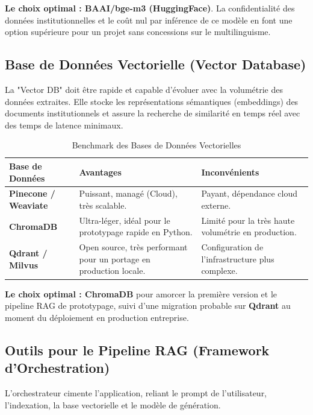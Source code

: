 \documentclass[12pt,a4paper]{article}
\begin{document}
\textbf{Le choix optimal : BAAI/bge-m3 (HuggingFace)}. La confidentialité des données institutionnelles et le coût nul par inférence de ce modèle en font une option supérieure pour un projet sans concessions sur le multilinguisme.

\subsection{Base de Données Vectorielle (Vector Database)}
La "Vector DB" doit être rapide et capable d'évoluer avec la volumétrie des données extraites. Elle stocke les représentations sémantiques (embeddings) des documents institutionnels et assure la recherche de similarité en temps réel avec des temps de latence minimaux.

\begin{table}[H]
    \centering
    \renewcommand{\arraystretch}{1.5}
    \begin{tabularx}{\textwidth}{|X|X|X|}
        \hline
        \textbf{Base de Données} & \textbf{Avantages} & \textbf{Inconvénients} \\
        \hline
        \textbf{Pinecone / Weaviate} & Puissant, managé (Cloud), très scalable. & Payant, dépendance cloud externe. \\
        \hline
        \textbf{ChromaDB} & Ultra-léger, idéal pour le prototypage rapide en Python. & Limité pour la très haute volumétrie en production. \\
        \hline
        \textbf{Qdrant / Milvus} & Open source, très performant pour un portage en production locale. & Configuration de l'infrastructure plus complexe. \\
        \hline
    \end{tabularx}
    \caption{Benchmark des Bases de Données Vectorielles}
\end{table}

\textbf{Le choix optimal : ChromaDB} pour amorcer la première version et le pipeline RAG de prototypage, suivi d'une migration probable sur \textbf{Qdrant} au moment du déploiement en production entreprise.

\subsection{Outils pour le Pipeline RAG (Framework d'Orchestration)}
L'orchestrateur cimente l'application, reliant le prompt de l'utilisateur, l'indexation, la base vectorielle et le modèle de génération.
\end{document}
